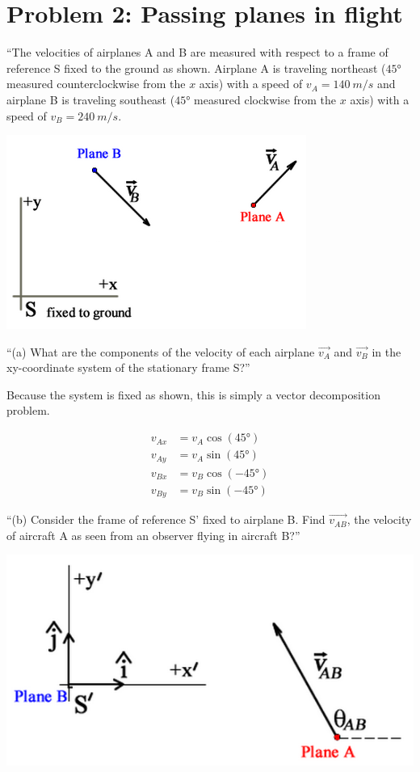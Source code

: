 \documentclass[8.01x]{subfiles}
\begin{document}
\section{Problem 2: Passing planes in flight}

``The velocities of airplanes A and B are measured with respect to a frame of reference S fixed to the ground as shown. Airplane A is traveling northeast ($\ang{45}$ measured counterclockwise from the $x$ axis) with a speed of $v_A = \SI{140}{m/s}$ and airplane B is traveling southeast ($\ang{45}$ measured clockwise from the $x$ axis) with a speed of $v_B = \SI{240}{m/s}$.

\begin{center}
\includegraphics[scale=0.7]{Graphics/h2p2_1}
\end{center}

``(a) What are the components of the velocity of each airplane $\vec{v_A}$ and $\vec{v_B}$ in the xy-coordinate system of the stationary frame S?''

Because the system is fixed as shown, this is simply a vector decomposition problem.

\begin{align}
v_{Ax} &= v_A \cos(\ang{45})\\
v_{Ay} &= v_A \sin(\ang{45})\\
v_{Bx} &= v_B \cos(-\ang{45})\\
v_{By} &= v_B \sin(-\ang{45})
\end{align}

``(b) Consider the frame of reference S' fixed to airplane B. Find $\vec{v_{AB}}$, the velocity of aircraft A as seen from an observer flying in aircraft B?''

\begin{center}
\includegraphics[scale=0.6]{Graphics/h2p2_2}
\end{center}
\end{document}
